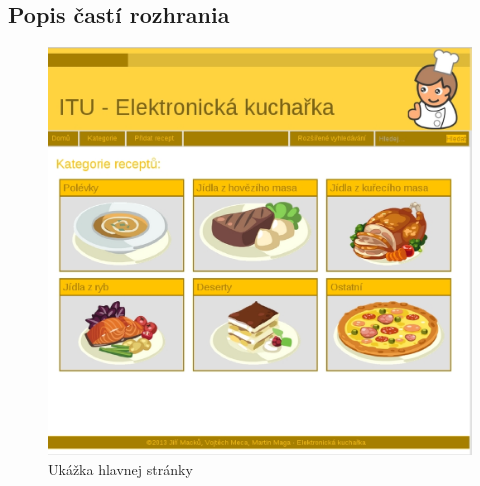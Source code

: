 \documentclass[12pt,a4paper,titlepage,final]{article}
\begin{document}
\subsection{Popis častí rozhrania}
\begin{figure}

\begin{center}

\includegraphics[scale=0.7]{img/home.eps} 
\caption{Ukážka hlavnej stránky}
\label{koncept}

\end{center}

\end{figure}
\end{document}

